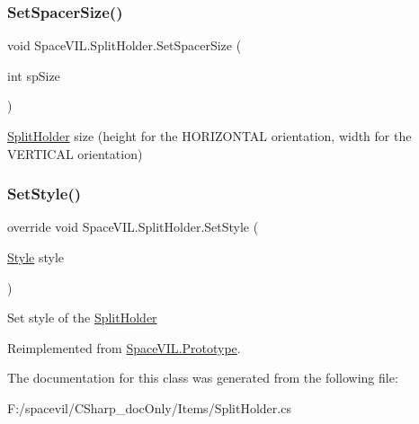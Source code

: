 \subsubsection{\texorpdfstring{Set\+Spacer\+Size()}{SetSpacerSize()}}
{\footnotesize\ttfamily void Space\+V\+I\+L.\+Split\+Holder.\+Set\+Spacer\+Size (\begin{DoxyParamCaption}\item[{int}]{sp\+Size }\end{DoxyParamCaption})}



\mbox{\hyperlink{class_space_v_i_l_1_1_split_holder}{Split\+Holder}} size (height for the H\+O\+R\+I\+Z\+O\+N\+T\+AL orientation, width for the V\+E\+R\+T\+I\+C\+AL orientation) 

\mbox{\label{class_space_v_i_l_1_1_split_holder_a0489f7db33f2310761600b11ea308c40}} 
\subsubsection{\texorpdfstring{Set\+Style()}{SetStyle()}}
{\footnotesize\ttfamily override void Space\+V\+I\+L.\+Split\+Holder.\+Set\+Style (\begin{DoxyParamCaption}\item[{\mbox{\hyperlink{class_space_v_i_l_1_1_decorations_1_1_style}{Style}}}]{style }\end{DoxyParamCaption})\hspace{0.3cm}{\ttfamily [virtual]}}



Set style of the \mbox{\hyperlink{class_space_v_i_l_1_1_split_holder}{Split\+Holder}} 



Reimplemented from \mbox{\hyperlink{class_space_v_i_l_1_1_prototype_ae96644a6ace490afb376fb542161e541}{Space\+V\+I\+L.\+Prototype}}.



The documentation for this class was generated from the following file\+:\begin{DoxyCompactItemize}
\item 
F\+:/spacevil/\+C\+Sharp\+\_\+doc\+Only/\+Items/Split\+Holder.\+cs\end{DoxyCompactItemize}
